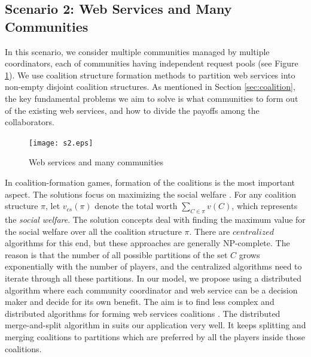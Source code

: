 \documentclass[10pt,journal,cspaper,compsoc]{IEEEtran}
\begin{document}
\subsection {Scenario 2: Web Services and Many Communities}

In this scenario, we consider multiple communities managed by
multiple coordinators, each of communities having
independent request pools (see Figure \ref{fig_sim2}).
We use coalition structure formation methods to
partition web services into non-empty disjoint coalition
structures. As mentioned in Section \ref{sec:coalition}, the key
fundamental problems we aim to solve is what communities to form
out of the existing web services, and how to divide the payoffs
among the collaborators.

\begin{figure}%
\centering
\texttt{[image: s2.eps]}
\caption{Web services and many communities} \label{fig_sim2}
\end{figure}

In coalition-formation games, formation of the coalitions is the
most important aspect. The solutions focus on maximizing the
social welfare \cite{
DBLP:conf/ijcai/GrecoMPS11,Sandholm1999209,DBLP:conf/ijcai/RahwanMJ11}.
For any coalition structure $\pi$, let $v_{cs}(\pi)$ denote the
total worth $\sum_{C \in \pi}{v(C)}$, which represents the
\emph{social welfare}. The solution concepts deal with finding the
maximum value for the social welfare over all the coalition
structure $\pi$. There are $centralized$ algorithms for this end,
but these approaches are generally NP-complete. The reason is that
the number of all possible partitions of the set $C$ grows
exponentially with the number of players, and the centralized
algorithms need to iterate through all these partitions.
In our model, we propose using a distributed algorithm where each
community coordinator and web service can be a decision maker and
decide for its own benefit. The aim is to find less complex and
distributed algorithms for forming web services coalitions
\cite{DBLP:journals/igtr/AptW09,Dieckmann02dynamiccoalition,ray2007game}.
The distributed merge-and-split algorithm in
\cite{DBLP:journals/igtr/AptW09} suits our application very well.
It keeps splitting and merging coalitions to partitions which are
preferred by all the players inside those coalitions.
\end{document}
